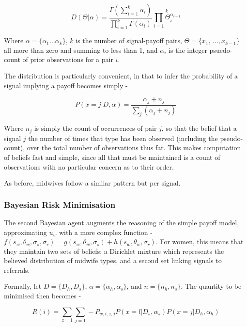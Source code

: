 \[
D(\Theta|\alpha)=\frac{\Gamma(\sum_{i=1}^{k}\alpha_{i})}{\prod_{i=1}^{k}\Gamma(\alpha_{i})}\overset{k}{\underset{i=1}{\prod}\Theta_{i}^{\alpha_{i-1}}}
\]


Where \(\alpha=\{\alpha_{1}\ldots\alpha_{k}\}\), \(k\) is the number
of signal-payoff pairs, \(\Theta=\{x_{1},\,\ldots,x_{k-\text{1}}\}\) all
more than zero and summing to less than 1, and \(\alpha_{i}\) is the integer
psuedo-count of prior observations for a pair \(i\). 

The distribution is particularly convenient, in that to infer the
probability of a signal implying a payoff becomes
simply -

\begin{equation}
P(x=j|D,\alpha)=\frac{\alpha_{j}+n_{j}}{\sum_{j}(\alpha_{j}+n_{j})}\label{eq:posterior}
\end{equation}


Where \(n_{j}\) is simply the count of occurrences of pair \(j\), so
that the belief that a signal \(j\) the number
of times that type has been observed (including the pseudo-count),
over the total number of observations thus far. This makes computation
of beliefs fast and simple, since all that must be maintained is
a count of observations with no particular concern as to their order.

As before, midwives follow a similar pattern but per signal.

\subsubsection{Bayesian Risk Minimisation}

The second Bayesian agent augments the reasoning of the simple payoff model, approximating \(u_{w}\) with a more complex function - \(f(s_{w}, \theta_{w}, \sigma_{s}, \sigma_{r})=g(s_{w}, \theta_{w}, \sigma_{s}) + h(s_{w}, \theta_{w}, \sigma_{r})\). For women, this means that they maintain two sets of beliefs: a Dirichlet mixture which represents the believed distribution of midwife types, and a second set linking signals to referrals.

Formally, let \(D=\{D_{h}, D_{s}\}\), \(\alpha=\{\alpha_{h},\alpha_{s}\}\), and \(n=\{n_{h},n_{s}\}\). The quantity to be minimised then becomes -

\begin{equation}
R(i)= \sum_{z=1}\sum_{j=1}-P_{w, i, z, j}P(x=l|D_{s},\alpha_{s})P(x=j|D_{h},\alpha_{h})\label{eq:risk}
\end{equation}

